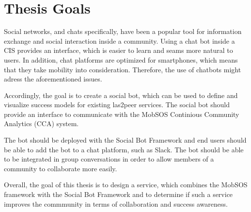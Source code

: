 \section{Thesis Goals}

Social networks, and chats specifically, have been a popular tool for information exchange and social interaction inside a community. Using a chat bot inside a CIS provides an interface, which is easier to learn and seams more natural to users. In addition, chat platforms are optimized for smartphones, which means that they take mobility into consideration. Therefore, the use of chatbots might adress the aforementioned issues.

Accordingly, the goal is to create a social bot, which can be used to define and visualize success models for existing las2peer services. The social bot should provide an interface to communicate with the MobSOS Continious Community Analytics (CCA) system.

The bot should be deployed with the Social Bot Framework and end users should be able to add the bot to a chat platform, such as Slack. The bot should be able to be integrated in group conversations in order to allow members of a community to collaborate more easily.

Overall, the goal of this thesis is to design a service, which combines the MobSOS framework with the Social Bot Framework and to determine if such a service improves the commmunity in terms of collaboration and success awareness.



